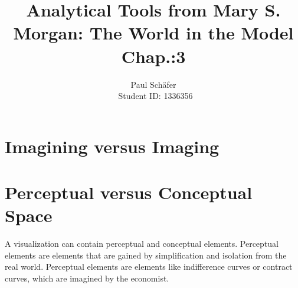 \documentclass[12pt,a4paper, margin = 2.5cm]{article}
\author{Paul Sch\"afer \\\ Student ID: 1336356}
\begin{document}
\title{Analytical Tools from Mary S. Morgan: The World in the Model Chap.:3}
\maketitle
\section*{Imagining versus Imaging}

\section*{Perceptual versus Conceptual Space}
A visualization can contain perceptual and conceptual elements. Perceptual elements are elements that are gained by simplification and isolation from the real world. Perceptual elements are elements like indifference curves or contract curves, which are imagined by the economist.
\pagebreak

\end{document}
